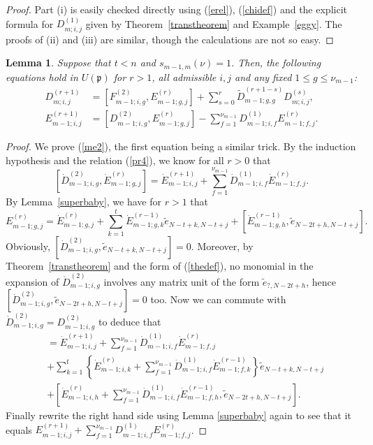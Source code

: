 \documentclass[twoside,12pt,reqno]{amsart}
\newtheorem{Lemma}[Proposition]{Lemma}
\begin{document}
\begin{proof}
Part (i) is easily checked directly
using (\ref{erel}), (\ref{chidef}) and the explicit
formula for $D_{m;i,j}^{(1)}$ given by Theorem~\ref{transtheorem}
and Example~\ref{eggy}.
The proofs of (ii) and (iii) are similar, though the
calculations are not so easy.
\end{proof}

\begin{Lemma}\label{hor3}
Suppose that 
$t < n$ and $s_{m-1,m}(\nu) = 1$.
Then, the following equations hold in $U(\mathfrak{p})$
for $r > 1$, all admissible $i,j$ and any fixed
$1 \leq g \leq \nu_{m-1}$:
\begin{align}\label{me1}
D_{m;i,j}^{(r+1)} &= 
[F_{m-1;i,g}^{(2)}, E_{m-1;g,j}^{(r)}]
+ \sum_{s=0}^r {\widetilde D}_{m-1;g,g}^{(r+1-s)} D_{m;i,j}^{(s)},\\
E_{m-1;i,j}^{(r+1)} &= [D_{m-1;i,g}^{(2)}, E_{m-1;g,j}^{(r)}]
- \sum_{f=1}^{\nu_{m-1}} D_{m-1;i,f}^{(1)} E_{m-1;f,j}^{(r)}.
\label{me2}
\end{align}
\end{Lemma}

\begin{proof}
We prove (\ref{me2}), the first equation being a similar trick.
By the induction hypothesis and the relation (\ref{pr4}), we know  
for all $r > 0$ that
$$
[\dot D_{m-1;i,g}^{(2)}, \dot E_{m-1;g,j}^{(r)}]
= \dot E_{m-1;i,j}^{(r+1)} + \sum_{f=1}^{\nu_{m-1}}
\dot D_{m-1;i,f}^{(1)} \dot E_{m-1;f,j}^{(r)}.
$$
By Lemma~\ref{superbaby}, we have for $r > 1$ that
$$
E_{m-1;g,j}^{(r)}
=
\dot E_{m-1;g,j}^{(r)}
+ \sum_{k=1}^t \dot E_{m-1;g,k}^{(r-1)} \tilde e_{N-t+k,N-t+j}
+ [\dot E_{m-1;g,h}^{(r-1)}, \tilde e_{N-2t+h,N-t+j}].
$$
Obviously,
$[\dot D_{m-1;i,g}^{(2)}, \tilde e_{N-t+k,N-t+j}]
=0$.
Moreover, by Theorem~\ref{transtheorem} and the form of
(\ref{thedef}), no monomial
in the expansion of $\dot D_{m-1;i,g}^{(2)}$ involves any
matrix unit of the form $\tilde e_{?, N-2t+h}$, hence 
$[\dot D_{m-1;i,g}^{(2)}, \tilde e_{N-2t+h,N-t+j}]
= 0$ too. 
Now we can commute with $\dot D_{m-1;i,g}^{(2)} = D_{m-1;i,g}^{(2)}$
to deduce that
\begin{align*}
[D_{m-1;i,g}^{(2)}, E_{m-1;g,j}^{(r)}] &=
\dot E_{m-1;i,j}^{(r+1)} + \sum_{f=1}^{\nu_{m-1}} \dot D_{m-1;i,f}^{(1)} \dot E_{m-1;f,j}^{(r)}\\
 &+ \sum_{k=1}^t \left\{
\dot E_{m-1;i,k}^{(r)} + 
\sum_{f=1}^{\nu_{m-1}} \dot D_{m-1;i,f}^{(1)}
\dot E_{m-1;f,k}^{(r-1)}
\right\}\tilde e_{N-t+k,N-t+j} \\
&+ 
\left[\dot E_{m-1;i,h}^{(r)}
+ \sum_{f=1}^{\nu_{m-1}} \dot D_{m-1;i,f}^{(1)} \dot E_{m-1;f,h}^{(r-1)},
\tilde e_{N-2t+h,N-t+j}\right].
\end{align*}
Finally rewrite the right hand side using Lemma \ref{superbaby} again to see
that it equals $E_{m-1;i,j}^{(r+1)} + \sum_{f=1}^{\nu_{m-1}}
D_{m-1;i,f}^{(1)}E_{m-1;f,j}^{(r)}$.
\end{proof}
\end{document}
